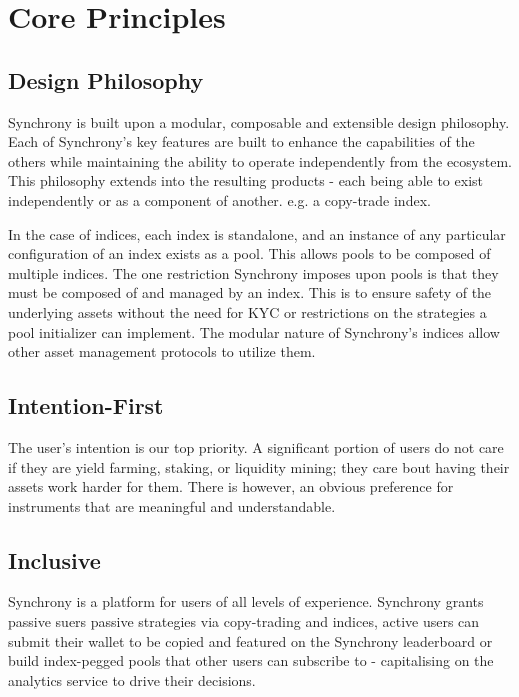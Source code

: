 \documentclass[10pt]{article}
\begin{document}
					\section{Core Principles}
					\subsection{Design Philosophy}
					Synchrony is built upon a modular, composable and extensible design philosophy.
					Each of Synchrony's key features are built to enhance the capabilities of the
					others while maintaining the ability to operate independently from the
					ecosystem. This philosophy extends into the resulting products - each being able
					to exist independently or as a component of another. e.g. a copy-trade index.
					\par
					In the case of indices, each index is standalone, and an instance of any
					particular configuration of an index exists as a pool. This allows pools to be
					composed of multiple indices. The one restriction Synchrony imposes upon pools is
					that they must be composed of and managed by an index. This is to ensure safety
					of the underlying assets without the need for KYC or restrictions on the
					strategies a pool initializer can implement. The modular nature of Synchrony's
					indices allow other asset management protocols to utilize them.
					\subsection{Intention-First}
					The user's intention is our top priority. A significant portion of users do not
					care if they are yield farming, staking, or liquidity mining; they care bout
					having their assets work harder for them. There is however, an obvious
					preference for instruments that are meaningful and understandable.
					\subsection{Inclusive}
					Synchrony is a platform for users of all levels of experience. Synchrony grants
					passive suers passive strategies via copy-trading and indices, active users can
					submit their wallet to be copied and featured on the Synchrony leaderboard or
					build index-pegged pools that other users can subscribe to - capitalising on the
					analytics service to drive their decisions.
\end{document}
